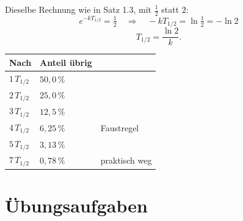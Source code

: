 \begin{merksatz}
Dieselbe Rechnung wie in Satz 1.3, mit $\frac12$ statt $2$:
\[ e^{-kT_{1/2}} = \tfrac12 \quad\Longrightarrow\quad -kT_{1/2} = \ln\tfrac12 = -\ln 2 \]
\[ T_{1/2} = \frac{\ln 2}{k} . \]

\begin{center}
\renewcommand{\arraystretch}{1.48}
\begin{tabular}{@{}P{2.6cm}P{2.4cm}P{2.6cm}@{}}
\toprule
\textbf{Nach} & \textbf{Anteil übrig} & \\
\midrule
$1\,T_{1/2}$ & $50{,}0\,\%$ & \\
$2\,T_{1/2}$ & $25{,}0\,\%$ & \\
$3\,T_{1/2}$ & $12{,}5\,\%$ & \\
$4\,T_{1/2}$ & $6{,}25\,\%$ & \textcolor{gruen}{Faustregel}\\
$5\,T_{1/2}$ & $3{,}13\,\%$ & \\
$7\,T_{1/2}$ & $0{,}78\,\%$ & praktisch weg\\
\bottomrule
\end{tabular}
\end{center}

\begin{center}
\begin{minipage}{0.88\textwidth}
\end{minipage}
\end{center}
\end{merksatz}

\section{Übungsaufgaben}

